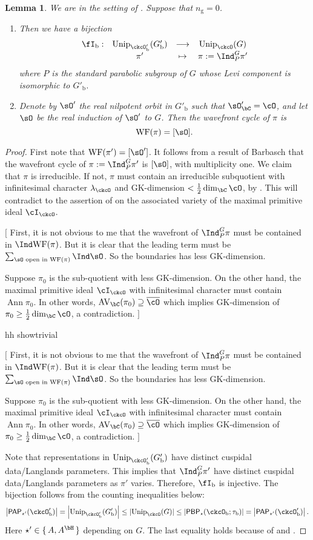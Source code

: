 \documentclass[12pt,a4paper]{amsart}
\newcommand{\trivial}[2][]{\if\relax\detokenize{#1}\relax
  {%
      \color{orange} \vspace{0em} $[$  #2 $]$
      \color{black}
  }
  \else
\ifx#1h
\ifcsname showtrivial\endcsname
{%
    \color{orange} \vspace{0em}  $[$ #2 $]$
    \color{black}
}
\fi
\else {\red Wrong argument!} \fi
\fi
}
\newcommand{\WF}{\mathrm{WF}}
\newcommand{\AV}{\mathrm{AV}}
\def\abs#1{\left|{#1}\right|}
\DeclareMathOperator{\Ann}{Ann}
\numberwithin{equation}{section}
\newtheorem{lem}[thm]{Lemma}
\theoremstyle{remark}
\def\half{{\tfrac{1}{2}}}
\def\Unip{\mathrm{Unip}}
\def\lamck{\lambda_\ckcO}
\def\PP{\mathsf{PAP}}
\def\PBP{\mathsf{PBP}}
\newcommand{\Grt}{\cK}
\begin{document}
\begin{lem}\label{lem:Unip.BP} We are in the setting of . Suppose that $n_{\mathrm g}=0$.
\begin{enumerate}
\item Then we have a bijection
  \[
    \begin{array}{rccc}
      \fI_{\mathrm b}: &\Unip_{\ckcO'_{\mathrm b}}(G'_{\mathrm b}) & \longrightarrow & \Unip_{\ckcO}(G) \\
      &\pi' & \mapsto & \pi:=\Ind_{P}^{G}\pi'
    \end{array}
  \]
  where $P$ is the standard parabolic subgroup of $G$ whose Levi component is
  isomorphic to $G'_{\mathrm b}$.
 \item Denote by $\sO'$ the real nilpotent orbit in $G'_{\mathrm b}$ such that $\sO'_{\bC}=\cO$, and let $\sO$ be the real induction of $\sO'$ to $G$.
  Then the wavefront cycle of $\pi $ is
  \[
    \WF(\pi) = [\sO].
  \]
 \end{enumerate}
\end{lem}
\begin{proof} First note that $\WF(\pi')=[\sO']$.
  It follows from a result of Barbasch \cite[Corollary 5.0.10]{B.Orbit} that the
  wavefront cycle of $\pi:=\Ind_{P}^{G}\pi'$ is $[\sO]$, with multiplicity one.
  We claim that $\pi$ is irreducible. If not, $\pi$ must contain an irreducible subquotient with infinitesimal
  character $\lambda_{\ckcO}$ and GK-dimension $<\half\dim_{\bC}\cO$, by \cite[Korollar 3.6]{BK}. This will
  contradict to the assertion of  on the associated variety of the maximal primitive ideal $\cI_{\ckcO}$.
  \trivial[h]{
    First, it is not obvious to me that the wavefront of $\Ind_{P}^{G}\pi$
    must be contained in $\Ind\WF(\pi)$. But it is clear that the leading term
    must be $\sum_{\sO\text{ open in } \WF(\pi)}\Ind\sO$. So the boundaries has
    less GK-dimension.

    Suppose $\pi_{0}$ is the sub-quotient with less GK-dimension.
    On the other hand, the maximal primitive ideal $\cI_{\ckcO}$  with infinitesimal
    character must contain $\Ann\pi_{0}$. In other words,
    $\AV_{\bC}(\pi_{0})\supseteq \bcO$ which implies GK-dimension of
    $\pi_{0}\geq \half\dim_{\bC}\cO$, a contradiction.
  }
  Note that representations in $\Unip_{\ckcO'_{\mathrm b}}(G'_{\mathrm b})$ have distinct
  cuspidal data/Langlands parameters. This implies that $\Ind_{P}^{G}\pi'$ have distinct cuspidal data/Langlands parameters as $\pi'$ varies.
    Therefore, $\fI_{\mathrm b}$ is injective. The bijection follows from the counting
  inequalities below:
  \[
    \abs{\PP_{\star'}(\ckcO'_{\mathrm b})}=\abs{\Unip_{\ckcO'_{\mathrm b}}(G'_{\mathrm b})}\leq \abs{\Unip_{\ckcO}(G)}
    \leq \abs{\PBP_{\star}(\ckcO_{\mathrm b}; \tau_{\mathrm b})} = \abs{\PP_{\star'}(\ckcO'_{\mathrm b})}.
  \]
  Here $\star' \in \set{A,A^{\bH}}$ depending on $G$. The last equality holds because of  and .
\end{proof}
\end{document}
